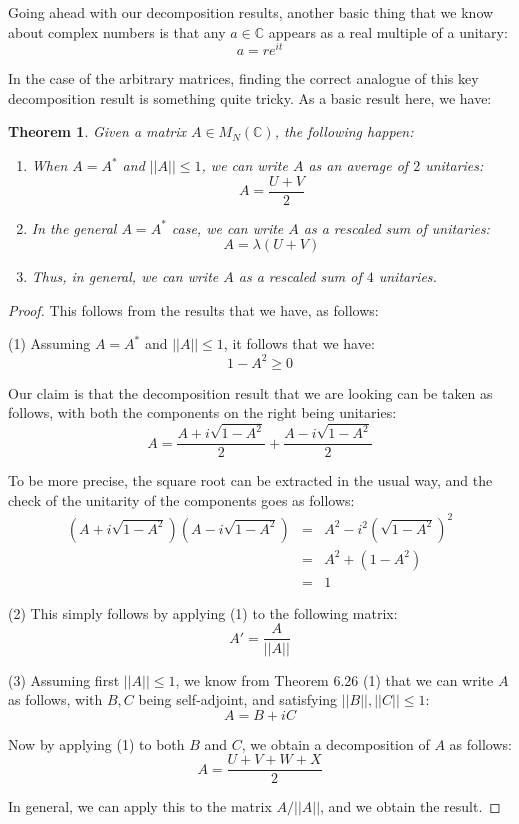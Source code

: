\documentclass[12pt]{amsbook}
\newtheorem{theorem}{Theorem}[chapter]
\begin{document}
Going ahead with our decomposition results, another basic thing that we know about complex numbers is that any $a\in\mathbb C$ appears as a real multiple of a unitary:
$$a=re^{it}$$

In the case of the arbitrary matrices, finding the correct analogue of this key decomposition result is something quite tricky. As a basic result here, we have:

\begin{theorem}
Given a matrix $A\in M_N(\mathbb C)$, the following happen:
\begin{enumerate}
\item When $A=A^*$ and $||A||\leq1$, we can write $A$ as an average of $2$ unitaries:
$$A=\frac{U+V}{2}$$

\item In the general $A=A^*$ case, we can write $A$ as a rescaled sum of unitaries:
$$A=\lambda(U+V)$$

\item Thus, in general, we can write $A$ as a rescaled sum of $4$ unitaries.
\end{enumerate}
\end{theorem}

\begin{proof}
This follows from the results that we have, as follows:

\medskip

(1) Assuming $A=A^*$ and $||A||\leq1$, it follows that we have:
$$1-A^2\geq0$$

Our claim is that the decomposition result that we are looking can be taken as follows, with both the components on the right being unitaries:
$$A=\frac{A+i\sqrt{1-A^2}}{2}+\frac{A-i\sqrt{1-A^2}}{2}$$

To be more precise, the square root can be extracted in the usual way, and the check of the unitarity of the components goes as follows:
\begin{eqnarray*}
(A+i\sqrt{1-A^2})(A-i\sqrt{1-A^2})
&=&A^2-i^2\left(\sqrt{1-A^2}\right)^2\\
&=&A^2+(1-A^2)\\
&=&1
\end{eqnarray*}

(2) This simply follows by applying (1) to the following matrix:
$$A'=\frac{A}{||A||}$$

(3) Assuming first $||A||\leq1$, we know from Theorem 6.26 (1) that we can write $A$ as follows, with $B,C$ being self-adjoint, and satisfying $||B||,||C||\leq1$:
$$A=B+iC$$

Now by applying (1) to both $B$ and $C$, we obtain a decomposition of $A$ as follows:
$$A=\frac{U+V+W+X}{2}$$

In general, we can apply this to the matrix $A/||A||$, and we obtain the result.
\end{proof}
\end{document}
